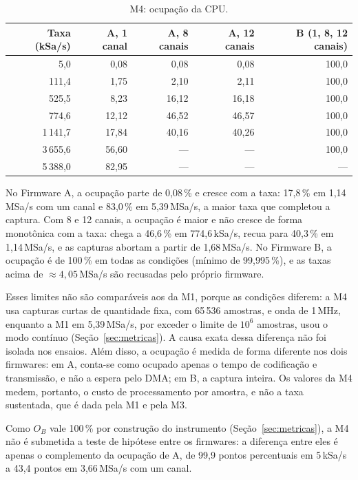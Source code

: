 \begin{table}[H]
  \centering
  \caption{M4: ocupação da CPU.}
  \label{tab:m4-ocupacao}
  \begin{tabular}{@{}rrrrr@{}}
    \toprule
    \textbf{Taxa (kSa/s)} & \textbf{A, 1 canal} & \textbf{A, 8 canais} &
    \textbf{A, 12 canais} & \textbf{B (1, 8, 12 canais)} \\
    \midrule
    5,0      &  0,08 &  0,08 &  0,08 & 100,0 \\
    111,4    &  1,75 &  2,10 &  2,11 & 100,0 \\
    525,5    &  8,23 & 16,12 & 16,18 & 100,0 \\
    774,6    & 12,12 & 46,52 & 46,57 & 100,0 \\
    1\,141,7 & 17,84 & 40,16 & 40,26 & 100,0 \\
    3\,655,6 & 56,60 & ---   & ---   & 100,0 \\
    5\,388,0 & 82,95 & ---   & ---   & ---   \\
    \bottomrule
  \end{tabular}
\end{table}

No Firmware A, a ocupação parte de 0,08\,\% e cresce com a taxa: 17,8\,\%
em 1,14\,MSa/s com um canal e 83,0\,\% em 5,39\,MSa/s, a maior taxa que
completou a captura. Com 8 e 12 canais, a ocupação é maior e não cresce de
forma monotônica com a taxa: chega a 46,6\,\% em 774,6\,kSa/s, recua para
40,3\,\% em 1,14\,MSa/s, e as capturas abortam a partir de 1,68\,MSa/s. No Firmware B, a ocupação é de
100\,\% em todas as condições (mínimo de 99,995\,\%), e as taxas acima de
$\approx 4{,}05$\,MSa/s são recusadas pelo próprio firmware.

Esses limites não são comparáveis aos da M1, porque as condições diferem:
a M4 usa capturas curtas de quantidade fixa, com 65\,536 amostras, e onda de
1\,MHz, enquanto a M1 em 5,39\,MSa/s, por exceder o limite de $10^6$
amostras, usou o modo contínuo (Seção~\ref{sec:metricas}). A causa exata
dessa diferença não foi isolada nos ensaios. Além disso, a ocupação é medida
de forma diferente nos dois firmwares: em A, conta-se como ocupado apenas o
tempo de codificação e transmissão, e não a espera pelo \ac{DMA}; em B, a captura
inteira. Os valores da M4 medem, portanto, o custo de processamento por
amostra, e não a taxa sustentada, que é dada pela M1 e pela M3.

Como $O_B$ vale 100\,\% por construção do instrumento
(Seção~\ref{sec:metricas}), a M4 não é submetida a teste de hipótese entre
os firmwares: a diferença entre eles é apenas o complemento da ocupação de
A, de 99,9 pontos percentuais em 5\,kSa/s a 43,4 pontos em 3,66\,MSa/s com
um canal.

